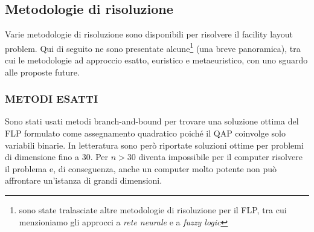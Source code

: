 \documentclass[12pt,a4paper,openright,twoside]{report}
\begin{document}
\subsection{Metodologie di risoluzione}
Varie metodologie di risoluzione sono disponibili per risolvere il facility layout problem. Qui di seguito ne sono presentate alcune\footnote{sono state tralasciate altre metodologie di risoluzione per il FLP, tra cui menzioniamo gli approcci a \textit{rete neurale} e a \textit{fuzzy logic}} (una breve panoramica), tra cui le metodologie ad approccio esatto, euristico e metaeuristico, con uno sguardo alle proposte future.
\subsubsection{METODI ESATTI}
Sono stati usati metodi branch-and-bound per trovare una soluzione ottima del FLP formulato come assegnamento quadratico poich\'{e} il QAP coinvolge solo variabili binarie. In letteratura sono per\`{o} riportate soluzioni ottime per problemi di dimensione fino a 30. Per $n > 30$ diventa impossibile per il computer risolvere il problema e, di conseguenza, anche un computer molto potente non pu\`{o} affrontare un'istanza di grandi dimensioni.
\end{document}
